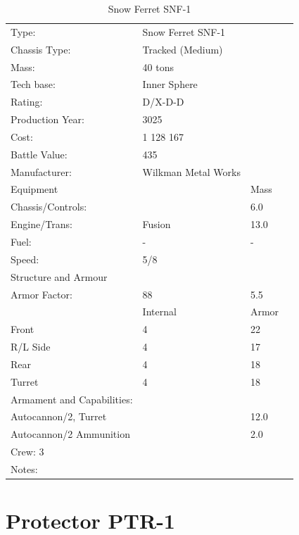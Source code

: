 \documentclass{tufte-book}
\begin{document}
\bigskip
\begin{table}
\begin{minipage}{\textwidth}
\begin{center}
\begin{tabular}{llll}
\toprule
Type: & Snow Ferret SNF-1 & \\
Chassis Type: & Tracked (Medium) & \\
Mass: & 40 tons & \\
Tech base: & Inner Sphere & \\
Rating: & D/X-D-D & \\
Production Year: & 3025 & \\
Cost: & 1 128 167 & \\
Battle Value: & 435 & \\
Manufacturer: & Wilkman Metal Works & \\
Equipment & & Mass \\
\quad Chassis/Controls: & & 6.0 \\
\quad Engine/Trans: & Fusion & 13.0 \\
\quad Fuel: & - & - \\
\quad Speed: & \multicolumn{2}{l}{5/8} \\
Structure and Armour & & \\
\quad Armor Factor: & 88 & 5.5 \\
\quad & Internal & Armor \\
\quad Front & 4 & 22 \\
\quad R/L Side & 4 & 17 \\
\quad Rear & 4 & 18 \\
\quad Turret & 4 & 18 \\

Armament and Capabilities: & & \\
\multicolumn{2}{l}{\quad 2 Autocannon/2, Turret} & 12.0 \\
\multicolumn{2}{l}{\quad Autocannon/2 Ammunition} & 2.0 \\


\multicolumn{3}{l}{Crew: 3} \\

Notes: & & \\


\bottomrule
\end{tabular}
\end{center}
\end{minipage}
\caption{Snow Ferret SNF-1}
\end{table}


\section{Protector PTR-1}
\end{document}
